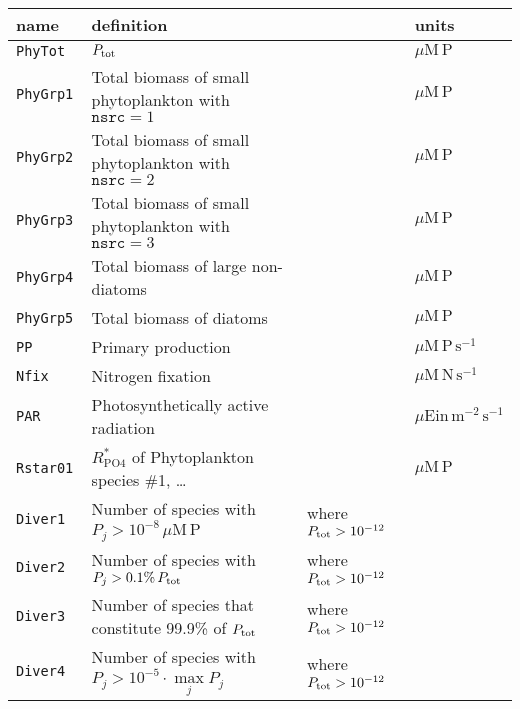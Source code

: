 \documentclass[11pt,letterpaper,english]{article}
\begin{document}
\begin{tabular}{llll}
 name & definition && units \\
\hline
 \texttt{PhyTot  } & $P_{\mathrm{tot}}$                                                        && $\mu\mathrm{M\,P}$ \\
 \texttt{PhyGrp1 } & Total biomass of small phytoplankton with $\texttt{nsrc}=1$    && $\mu\mathrm{M\,P}$ \\
 \texttt{PhyGrp2 } & Total biomass of small phytoplankton with $\texttt{nsrc}=2$    && $\mu\mathrm{M\,P}$ \\
 \texttt{PhyGrp3 } & Total biomass of small phytoplankton with $\texttt{nsrc}=3$    && $\mu\mathrm{M\,P}$ \\
 \texttt{PhyGrp4 } & Total biomass of large non-diatoms                             && $\mu\mathrm{M\,P}$ \\
 \texttt{PhyGrp5 } & Total biomass of diatoms                                       && $\mu\mathrm{M\,P}$ \\
 \texttt{PP      } & Primary production                                             && $\mu\mathrm{M\,P}\, \mathrm{s}^{-1}$ \\
 \texttt{Nfix    } & Nitrogen fixation                                              && $\mu\mathrm{M\,N}\, \mathrm{s}^{-1}$ \\
 \texttt{PAR     } & Photosynthetically active radiation                            && $\mu\mathrm{Ein}\, \mathrm{m}^{-2}\,\mathrm{s}^{-1}$ \\
 \texttt{Rstar01 } & $R^*_{\mathrm{PO4}}$ of Phytoplankton species \#1, \dots       && $\mu\mathrm{M\,P}$ \\
 \texttt{Diver1  } & Number of species with $P_j > 10^{-8}\,\mu\mathrm{M\,P}$       & where $P_{\mathrm{tot}}>10^{-12}$ \\
 \texttt{Diver2  } & Number of species with $P_j > 0.1\%\,  P_{\mathrm{tot}}$                  & where $P_{\mathrm{tot}}>10^{-12}$ \\
 \texttt{Diver3  } & Number of species that constitute 99.9\% of $P_{\mathrm{tot}}$            & where $P_{\mathrm{tot}}>10^{-12}$ \\
 \texttt{Diver4  } & Number of species with $P_j > 10^{-5} \cdot \max\limits_j P_j$ & where $P_{\mathrm{tot}}>10^{-12}$ \\
\end{tabular}
\end{document}
